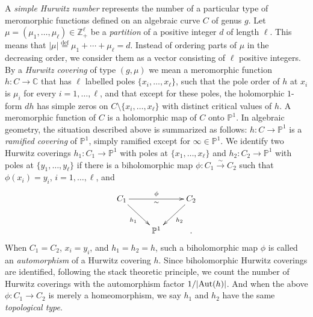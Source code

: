 \documentclass{amsart}
\theoremstyle{definition}
\numberwithin{equation}{section}
\numberwithin{figure}{section}
\def\Aut{{\text{\rm{Aut}}}}
\newcommand{\bP}{{\mathbb{P}}}
\newcommand{\bC}{{\mathbb{C}}}
\newcommand{\bZ}{{\mathbb{Z}}}
\begin{document}
A \emph{simple Hurwitz number} represents the number
of a particular type of meromorphic functions
defined on an algebraic curve $C$ of genus $g$.
Let $\mu=(\mu_1,\dots,\mu_\ell)\in\bZ_+ ^\ell$
be a \emph{partition} of a positive integer
$d$ of length $\ell$. This means
that $|\mu|\overset{\text{def}}{=}
\mu_1+\cdots+\mu_\ell = d$. Instead of ordering 
 parts of $\mu$ in the decreasing order,
 we consider them as a vector consisting of
 $\ell$ positive integers. 
By a \emph{Hurwitz covering} of 
type $(g,\mu)$ we mean a
meromorphic function $h:C\rightarrow \bC$
that has $\ell$ labelled poles $\{x_i,\dots,x_\ell\}$,
such that the pole order of $h$ at $x_i$ is 
 $\mu_i$ for every $i=1,\dots,\ell$,
 and that except for these poles, the holomorphic
 $1$-form $dh$ has simple zeros on
 $C\setminus \{x_i,\dots,x_\ell\}$ with 
 distinct critical values of $h$.
 A meromorphic function of $C$ is a holomorphic
 map of $C$ onto $\bP^1$. 
 In algebraic geometry, the situation described above
 is summarized as follows: $h:C\rightarrow \bP^1$ is
 a \emph{ramified covering} of $\bP^1$, 
 simply ramified except for $\infty\in\bP^1$.
 We identify two Hurwitz coverings $h_1:C_1\rightarrow
 \bP^1$ with poles at
 $\{x_1,\dots,x_\ell\}$ and $h_2:C_2\rightarrow
 \bP^1$ with poles at 
 $\{y_1,\dots,y_\ell\}$
 if there is a biholomorphic map 
 $\phi:C_1\overset{\sim}{\rightarrow} C_2$
 such that $\phi(x_i) = y_i$, $i=1,\dots,\ell$, and 
 \begin{equation*}
		\xymatrix{
		C_1\ar[dr]_{h_1}  
		\ar[rr]^\phi _\sim &&C_2\ar[dl]^{h_2}\\
		&\bP ^1&.
		}
\end{equation*} 
When $C_1=C_2$, $x_i=y_i$,
 and $h_1=h_2=h$, such a
biholomorphic map $\phi$ is called an 
\emph{automorphism}
of a Hurwitz covering $h$.
Since biholomorphic Hurwitz coverings are
identified,  following the stack theoretic principle, we  
count the number of  Hurwitz coverings with the 
automorphism factor $1/|\Aut(h)|$.
And when the above $\phi:C_1{\rightarrow} C_2$
is merely a homeomorphism,  we say 
$h_1$ and $h_2$ have the same 
\emph{topological type}.
\end{document}
